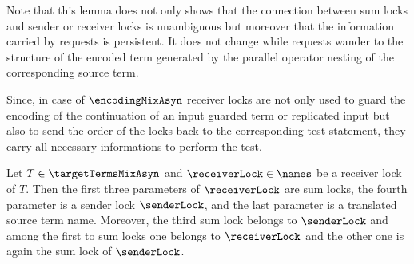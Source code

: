\documentclass[]{llncs}
\begin{document}
Note that this lemma does not only shows that the connection between sum locks and sender or receiver locks is unambiguous but moreover that the information carried by requests is persistent. It does not change while requests wander to the structure of the encoded term generated by the parallel operator nesting of the corresponding source term.

Since, in case of $ \encodingMixAsyn $ receiver locks are not only used to guard the encoding of the continuation of an input guarded term or replicated input but also to send the order of the locks back to the corresponding test-statement, they carry all necessary informations to perform the test.

\begin{lemma} \label{lem:parametersReceiverLock}
	Let $ T \in \targetTermsMixAsyn $ and $ \receiverLock \in \names $ be a receiver lock of $ T $. Then the first three parameters of $ \receiverLock $ are sum locks, the fourth parameter is a sender lock $ \senderLock $, and the last parameter is a translated source term name. Moreover, the third sum lock belongs to $ \senderLock $ and among the first to sum locks one belongs to $ \receiverLock $ and the other one is again the sum lock of $ \senderLock $.
\end{lemma}
\end{document}
